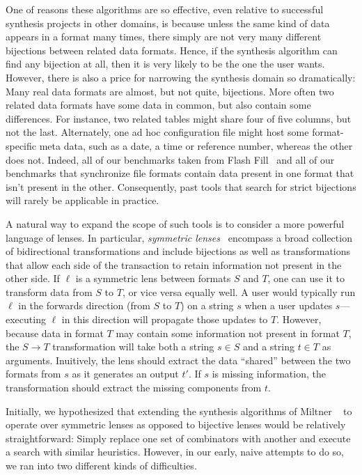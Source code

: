 \documentclass[acmsmall,screen,anonymous]{acmart}
\begin{document}
One of reasons these algorithms are so effective, even relative to successful
synthesis projects in other domains, is because unless the same kind of data
appears in a format many times, there simply are not very many different
bijections between related data formats. Hence, if the synthesis algorithm can
find any bijection at all, then it is very likely to be the one the user wants.
However, there is also a price for narrowing the synthesis domain so
dramatically: Many real data formats are almost, but not quite, bijections. More
often two related data formats have some data in common, but also contain some
differences. For instance, two related tables might share four of five columns,
but not the last. Alternately, one ad hoc configuration file might host some
format-specific meta data, such as a date, a time or reference number, whereas
the other does not. Indeed, all of our benchmarks taken from Flash
Fill~\cite{flashfill} and all of our benchmarks that synchronize file formats
contain data present in one format that isn't present in the other.
Consequently, past tools that search for strict bijections will rarely be
applicable in practice.

A natural way to expand the scope of such tools is to consider a more
powerful language of lenses.  In particular, \emph{symmetric
lenses}~\cite{symmetric-lenses} encompass a broad collection of bidirectional
transformations and include bijections as well as transformations that
allow each side of the transaction to retain information not present
in the other side.  If $\ell$ is a symmetric lens between formats $S$ and $T$, one can
use it to transform data from $S$ to $T$, or vice versa equally well.  A user would typically
run $\ell$ in the forwards direction (from $S$ to $T$) on a string $s$ when a user updates
$s$---executing $\ell$ in this direction will propagate those updates to $T$.
However, because data in format $T$ may contain some information not present in format $T$,
the $S \rightarrow T$ transformation will take
both a string $s \in S$ and a string $t \in T$ as arguments.
Inuitively, the lens should extract the data ``shared'' between the two formats from $s$
as it generates an output $t'$.  If $s$ is missing information, the transformation should
extract the missing components from $t$.

Initially, we hypothesized that extending the synthesis algorithms
of Miltner \ETAL~\cite{miltner+:bijective-synthesis} to operate over symmetric lenses
as opposed to bijective lenses 
would be relatively straightforward:  Simply replace one set of combinators with another
and execute a search with similar heuristics.  However, in our early,
naive attempts to do so, we ran
into two different kinds of difficulties. 
\end{document}
